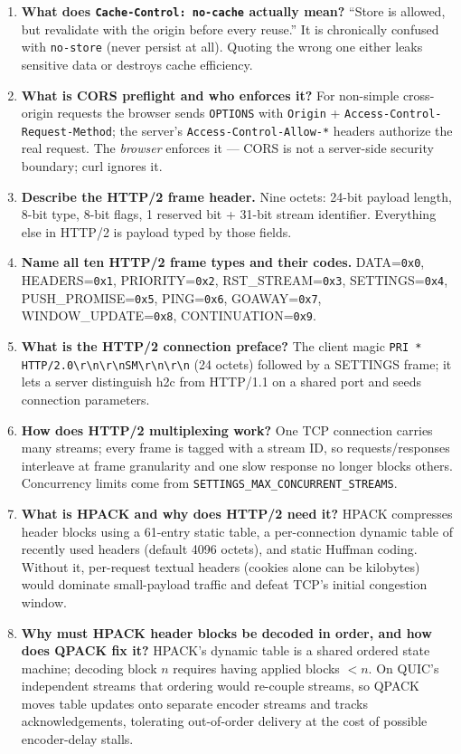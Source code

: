 \begin{enumerate}[label=\textbf{Q\arabic*.}, leftmargin=2.8em, start=13]
  \item \textbf{What does \texttt{Cache-Control: no-cache} actually mean?} ``Store is allowed, but revalidate with the origin before every reuse.'' It is chronically confused with \texttt{no-store} (never persist at all). Quoting the wrong one either leaks sensitive data or destroys cache efficiency.
  \item \textbf{What is CORS preflight and who enforces it?} For non-simple cross-origin requests the browser sends \texttt{OPTIONS} with \texttt{Origin} + \texttt{Access-Control-Request-Method}; the server's \texttt{Access-Control-Allow-*} headers authorize the real request. The \emph{browser} enforces it --- CORS is not a server-side security boundary; curl ignores it.
  \item \textbf{Describe the HTTP/2 frame header.} Nine octets: 24-bit payload length, 8-bit type, 8-bit flags, 1 reserved bit + 31-bit stream identifier. Everything else in HTTP/2 is payload typed by those fields.
  \item \textbf{Name all ten HTTP/2 frame types and their codes.} DATA=\texttt{0x0}, HEADERS=\texttt{0x1}, PRIORITY=\texttt{0x2}, RST\_STREAM=\texttt{0x3}, SETTINGS=\texttt{0x4}, PUSH\_PROMISE=\texttt{0x5}, PING=\texttt{0x6}, GOAWAY=\texttt{0x7}, WINDOW\_UPDATE=\texttt{0x8}, CONTINUATION=\texttt{0x9}.
  \item \textbf{What is the HTTP/2 connection preface?} The client magic \texttt{PRI * HTTP/2.0\textbackslash r\textbackslash n\textbackslash r\textbackslash nSM\textbackslash r\textbackslash n\textbackslash r\textbackslash n} (24 octets) followed by a SETTINGS frame; it lets a server distinguish h2c from HTTP/1.1 on a shared port and seeds connection parameters.
  \item \textbf{How does HTTP/2 multiplexing work?} One TCP connection carries many streams; every frame is tagged with a stream ID, so requests/responses interleave at frame granularity and one slow response no longer blocks others. Concurrency limits come from \texttt{SETTINGS\_MAX\_CONCURRENT\_STREAMS}.
  \item \textbf{What is HPACK and why does HTTP/2 need it?} HPACK compresses header blocks using a 61-entry static table, a per-connection dynamic table of recently used headers (default 4096 octets), and static Huffman coding. Without it, per-request textual headers (cookies alone can be kilobytes) would dominate small-payload traffic and defeat TCP's initial congestion window.
  \item \textbf{Why must HPACK header blocks be decoded in order, and how does QPACK fix it?} HPACK's dynamic table is a shared ordered state machine; decoding block $n$ requires having applied blocks $<n$. On QUIC's independent streams that ordering would re-couple streams, so QPACK moves table updates onto separate encoder streams and tracks acknowledgements, tolerating out-of-order delivery at the cost of possible encoder-delay stalls.
\end{enumerate}


